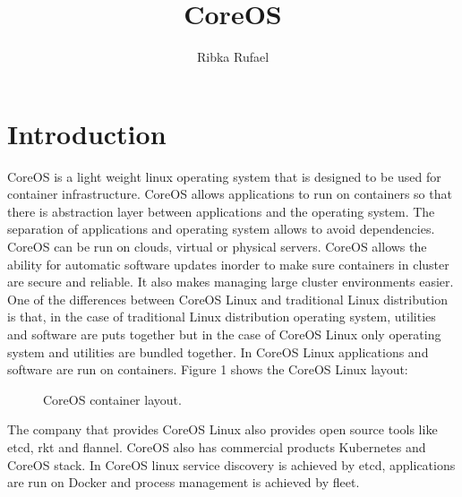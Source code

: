 \documentclass[9pt,twocolumn,twoside]{styles/osajnl}
\title{CoreOS}
\author[1, *]{Ribka Rufael}
\affil[1]{School of Informatics and Computing, Bloomington, IN 47408, U.S.A.}
\affil[*]{Corresponding authors: rrufael@umail.iu.edu HID: S17-IO-3016}
\begin{document}
\maketitle

\section{Introduction}

CoreOS \cite{www-core} is a light weight linux operating system that
is designed to be used for container infrastructure. CoreOS allows
applications to run on containers so that there is abstraction layer
between applications and the operating system. The separation of
applications and operating system allows to avoid dependencies.
CoreOS can be run on clouds, virtual or physical servers. CoreOS
allows the ability for automatic software updates inorder to make sure
containers in cluster are secure and reliable. It also makes managing
large cluster environments easier. One of the differences between
CoreOS Linux and traditional Linux distribution is that, in the case
of traditional Linux distribution operating system, utilities and
software are puts together but in the case of CoreOS Linux only
operating system and utilities are bundled together. In CoreOS Linux
applications and software are run on containers. Figure 1 shows the
CoreOS Linux layout:


\begin{figure}[htbp]
\centering
{}
\caption{CoreOS container layout.  \cite{www-core} }
\label{fig:false-color}
\end{figure}

The company that provides CoreOS Linux also provides open source tools
like etcd, rkt and flannel. CoreOS also has commercial products
Kubernetes and CoreOS stack. In CoreOS linux service discovery is
achieved by etcd, applications are run on Docker and process
management is achieved by fleet.
\end{document}
